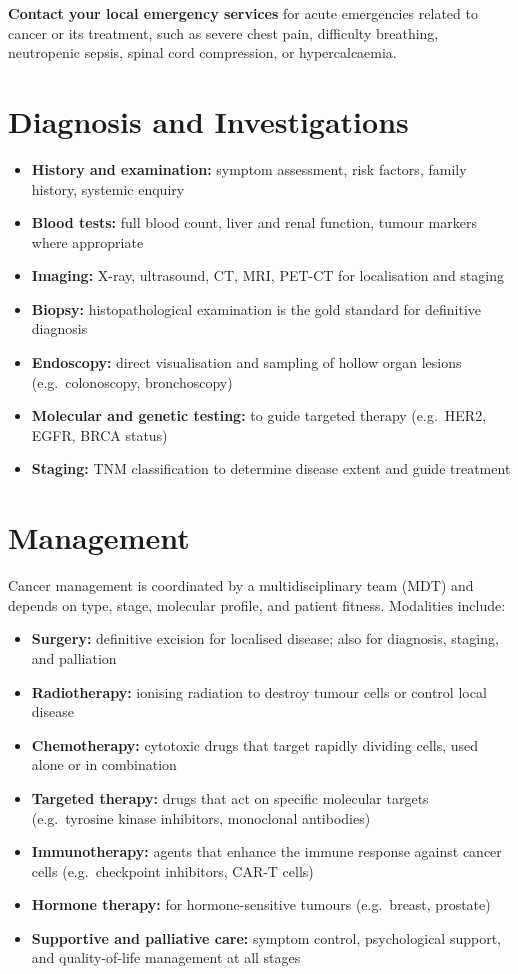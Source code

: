 \textbf{Contact your local emergency services} for acute emergencies related to cancer or its treatment, such as severe chest pain, difficulty breathing, neutropenic sepsis, spinal cord compression, or hypercalcaemia.

\section*{Diagnosis and Investigations}
\begin{itemize}
    \item \textbf{History and examination:} symptom assessment, risk factors, family history, systemic enquiry
    \item \textbf{Blood tests:} full blood count, liver and renal function, tumour markers where appropriate
    \item \textbf{Imaging:} X-ray, ultrasound, CT, MRI, PET-CT for localisation and staging
    \item \textbf{Biopsy:} histopathological examination is the gold standard for definitive diagnosis
    \item \textbf{Endoscopy:} direct visualisation and sampling of hollow organ lesions (e.g.\ colonoscopy, bronchoscopy)
    \item \textbf{Molecular and genetic testing:} to guide targeted therapy (e.g.\ HER2, EGFR, BRCA status)
    \item \textbf{Staging:} TNM classification to determine disease extent and guide treatment
\end{itemize}

\section*{Management}
Cancer management is coordinated by a multidisciplinary team (MDT) and depends on type, stage, molecular profile, and patient fitness. Modalities include:

\begin{itemize}
    \item \textbf{Surgery:} definitive excision for localised disease; also for diagnosis, staging, and palliation
    \item \textbf{Radiotherapy:} ionising radiation to destroy tumour cells or control local disease
    \item \textbf{Chemotherapy:} cytotoxic drugs that target rapidly dividing cells, used alone or in combination
    \item \textbf{Targeted therapy:} drugs that act on specific molecular targets (e.g.\ tyrosine kinase inhibitors, monoclonal antibodies)
    \item \textbf{Immunotherapy:} agents that enhance the immune response against cancer cells (e.g.\ checkpoint inhibitors, CAR-T cells)
    \item \textbf{Hormone therapy:} for hormone-sensitive tumours (e.g.\ breast, prostate)
    \item \textbf{Supportive and palliative care:} symptom control, psychological support, and quality-of-life management at all stages
\end{itemize}

